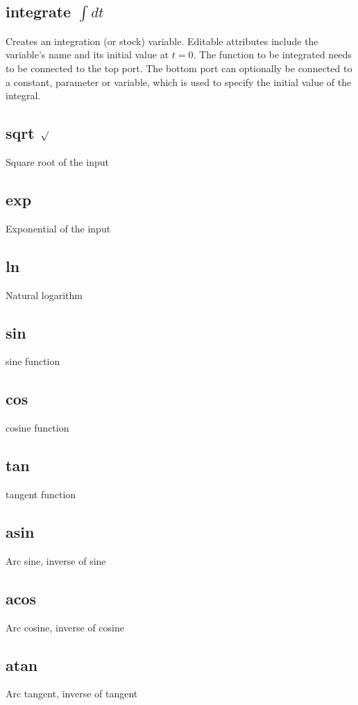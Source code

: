 \subsection{integrate $\int dt$}\label{IntOp}  Creates an integration (or stock)
variable. Editable attributes include the variable's name and its
initial value at $t=0$. The function to be integrated needs to be
connected to the top port. The bottom port can optionally be connected
to a constant, parameter or variable, which is used to specify the
initial value of the integral.

\subsection{sqrt $\surd$}\label{Operation:sqrt} Square root of the input

\subsection{exp}\label{Operation:exp} Exponential of the input

\subsection{ln}\label{Operation:ln} Natural logarithm

\subsection{sin}\label{Operation:sin} sine function
\subsection{cos}\label{Operation:cos} cosine function
\subsection{tan}\label{Operation:tan} tangent function
\subsection{asin}\label{Operation:asin} Arc sine, inverse of sine
\subsection{acos}\label{Operation:acos} Arc cosine, inverse of cosine
\subsection{atan}\label{Operation:atan} Arc tangent, inverse of tangent
